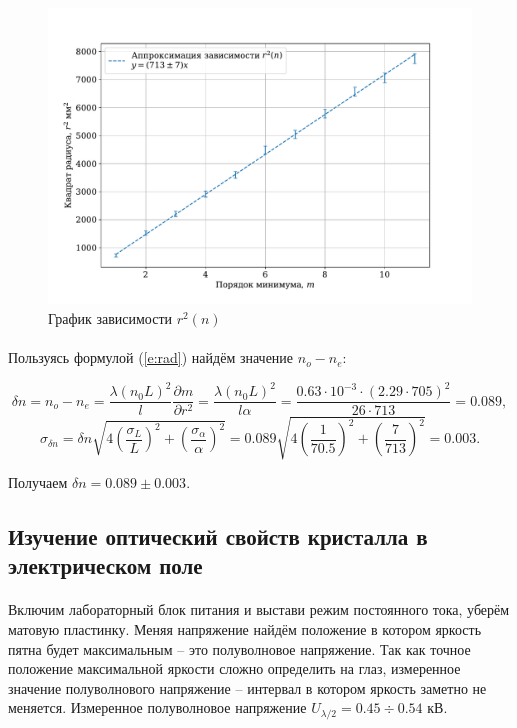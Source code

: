 \documentclass[a4paper,12pt]{article} %
\begin{document}
\begin{figure}[h]
\centering
\includegraphics[width=\textwidth]{plot.pdf}
\caption{График зависимости $r^2(n)$}
\label{fig:plot}
\end{figure}

\paragraph{} Пользуясь формулой (\ref{e:rad}) найдём значение $n_o - n_e$:

\[
\delta n = n_o - n_e = \frac{\lambda (n_0 L)^2}{l} \frac{\partial m}{\partial r^2} = \frac{\lambda (n_0 L)^2}{l \alpha} = \frac{0.63 \cdot 10^{-3} \cdot (2.29 \cdot 705)^2}{26 \cdot 713} = 0.089,
\]\[
\sigma_{\delta n} = \delta n \sqrt{4\left( \frac{\sigma_L}{L} \right)^2 + \left( \frac{\sigma_\alpha}{\alpha} \right)^2} = 0.089 \sqrt{4\left( \frac{1}{70.5} \right)^2 + \left( \frac{7}{713} \right)^2} = 0.003.
\]

\noindent Получаем $\delta n = 0.089 \pm 0.003$.

\subsection{Изучение оптический свойств кристалла в электрическом поле}

\paragraph{} Включим лабораторный блок питания и выстави режим постоянного тока, уберём матовую пластинку. Меняя напряжение найдём положение в котором яркость пятна будет максимальным -- это полуволновое напряжение. Так как точное положение максимальной яркости сложно определить на глаз, измеренное значение полуволнового напряжение -- интервал в котором яркость заметно не меняется. Измеренное полуволновое напряжение $U_{\lambda / 2} = 0.45 \div 0.54$ кВ. 
\end{document}
